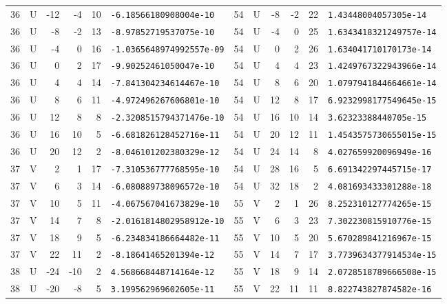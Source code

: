 \begin{longtable}{rcrrrl|rcrrrl}
36 & U & -12 & -4 & 10 & \texttt{-6.18566180908004e-10} & 54 & U & -8 & -2 & 22 & \texttt{1.43448004057305e-14}\\
36 & U & -8 & -2 & 13 & \texttt{-8.97852719537075e-10} & 54 & U & -4 & 0 & 25 & \texttt{1.6343418321249757e-14}\\
36 & U & -4 & 0 & 16 & \texttt{-1.0365648974992557e-09} & 54 & U & 0 & 2 & 26 & \texttt{1.634041710170173e-14}\\
36 & U & 0 & 2 & 17 & \texttt{-9.90252461050047e-10} & 54 & U & 4 & 4 & 23 & \texttt{1.4249767322943966e-14}\\
36 & U & 4 & 4 & 14 & \texttt{-7.841304234614467e-10} & 54 & U & 8 & 6 & 20 & \texttt{1.0797941844664661e-14}\\
36 & U & 8 & 6 & 11 & \texttt{-4.972496267606801e-10} & 54 & U & 12 & 8 & 17 & \texttt{6.9232998177549645e-15}\\
36 & U & 12 & 8 & 8 & \texttt{-2.3208515794371476e-10} & 54 & U & 16 & 10 & 14 & \texttt{3.62323388440705e-15}\\
36 & U & 16 & 10 & 5 & \texttt{-6.681826128452716e-11} & 54 & U & 20 & 12 & 11 & \texttt{1.4543575730655015e-15}\\
36 & U & 20 & 12 & 2 & \texttt{-8.046101202380329e-12} & 54 & U & 24 & 14 & 8 & \texttt{4.027659920096949e-16}\\
37 & V & 2 & 1 & 17 & \texttt{-7.310536777768595e-10} & 54 & U & 28 & 16 & 5 & \texttt{6.691342297445715e-17}\\
37 & V & 6 & 3 & 14 & \texttt{-6.080889738096572e-10} & 54 & U & 32 & 18 & 2 & \texttt{4.081693433301288e-18}\\
37 & V & 10 & 5 & 11 & \texttt{-4.067567041673829e-10} & 55 & V & 2 & 1 & 26 & \texttt{8.252310127774265e-15}\\
37 & V & 14 & 7 & 8 & \texttt{-2.0161814802958912e-10} & 55 & V & 6 & 3 & 23 & \texttt{7.302230815910776e-15}\\
37 & V & 18 & 9 & 5 & \texttt{-6.234834186664482e-11} & 55 & V & 10 & 5 & 20 & \texttt{5.670289841216967e-15}\\
37 & V & 22 & 11 & 2 & \texttt{-8.18641465201394e-12} & 55 & V & 14 & 7 & 17 & \texttt{3.7739634377914534e-15}\\
38 & U & -24 & -10 & 2 & \texttt{4.568668448714164e-12} & 55 & V & 18 & 9 & 14 & \texttt{2.0728518789666508e-15}\\
38 & U & -20 & -8 & 5 & \texttt{3.199562969602605e-11} & 55 & V & 22 & 11 & 11 & \texttt{8.822743827874582e-16}\\

\end{longtable}
